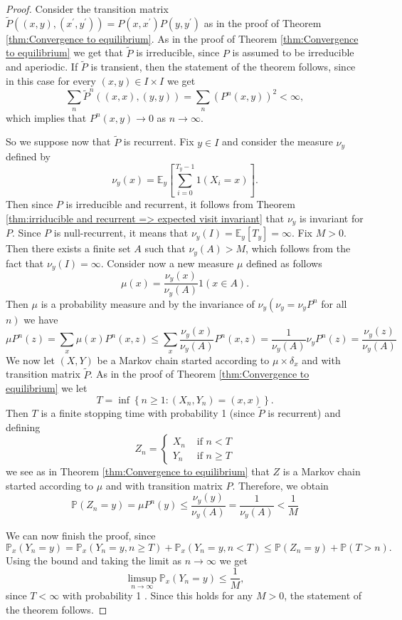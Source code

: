 \documentclass[a4paper]{article}
\begin{document}
\begin{proof}
    Consider the transition matrix $\widetilde{P}\left((x, y),\left(x^{\prime}, y^{\prime}\right)\right)=P\left(x, x^{\prime}\right) P\left(y, y^{\prime}\right)$ as in the proof of Theorem \ref{thm:Convergence to equilibrium}. As in the proof of Theorem \ref{thm:Convergence to equilibrium} we get that $\widetilde{P}$ is irreducible, since $P$ is assumed to be irreducible and aperiodic. If $\widetilde{P}$ is transient, then the statement of the theorem follows, since in this case for every $(x, y) \in I \times I$ we get
    \[
    \sum_n \widetilde{P}^n((x, x),(y, y))=\sum_n\left(P^n(x, y)\right)^2<\infty,
    \]
    which implies that $P^n(x, y) \rightarrow 0$ as $n \rightarrow \infty$.

    So we suppose now that $\widetilde{P}$ is recurrent. Fix $y \in I$ and consider the measure $\nu_y$ defined by
    \[
    \nu_y(x)=\mathbb{E}_y\left[\sum_{i=0}^{T_y-1} 1\left(X_i=x\right)\right] .
    \]
    Then since $P$ is irreducible and recurrent, it follows from Theorem \ref{thm:irriducible and recurrent => expected visit invariant} that $\nu_y$ is invariant for $P$. Since $P$ is null-recurrent, it means that $\nu_y(I)=\mathbb{E}_y\left[T_y\right]=\infty$. Fix $M>0$. Then there exists a finite set $A$ such that $\nu_y(A)>M$, which follows from the fact that $\nu_y(I)=\infty$. Consider now a new measure $\mu$ defined as follows
    \[
    \mu(x)=\frac{\nu_y(x)}{\nu_y(A)} 1(x \in A) .
    \]
    Then $\mu$ is a probability measure and by the invariance of $\nu_y\left(\nu_y=\nu_y P^n\right.$ for all $\left.n\right)$ we have
    \[
    \mu P^n(z)=\sum_x \mu(x) P^n(x, z) \leq \sum_x \frac{\nu_y(x)}{\nu_y(A)} P^n(x, z)=\frac{1}{\nu_y(A)} \nu_y P^n(z)=\frac{\nu_y(z)}{\nu_y(A)}
    \]
    We now let $(X, Y)$ be a Markov chain started according to $\mu \times \delta_x$ and with transition matrix $\widetilde{P}$. As in the proof of Theorem \ref{thm:Convergence to equilibrium} we let
    \[
    T=\inf \left\{n \geq 1:\left(X_n, Y_n\right)=(x, x)\right\} .
    \]
    Then $T$ is a finite stopping time with probability 1 (since $\widetilde{P}$ is recurrent) and defining
    \[
    Z_n=\begin{cases}
        X_n & \text { if } n<T \\
        Y_n & \text { if } n \geq T
    \end{cases} 
    \]
    we see as in Theorem \ref{thm:Convergence to equilibrium} that $Z$ is a Markov chain started according to $\mu$ and with transition matrix $P$. Therefore, we obtain
    \[
    \mathbb{P}\left(Z_n=y\right)=\mu P^n(y) \leq \frac{\nu_y(y)}{\nu_y(A)}=\frac{1}{\nu_y(A)}<\frac{1}{M}
    \]

    We can now finish the proof, since
    \[
    \mathbb{P}_x\left(Y_n=y\right)=\mathbb{P}_x\left(Y_n=y, n \geq T\right)+\mathbb{P}_x\left(Y_n=y, n<T\right) \leq \mathbb{P}\left(Z_n=y\right)+\mathbb{P}(T>n) .
    \]
    Using the bound and taking the limit as $n \rightarrow \infty$ we get
    \[
    \limsup _{n \rightarrow \infty} \mathbb{P}_x\left(Y_n=y\right) \leq \frac{1}{M},
    \]
    since $T<\infty$ with probability 1 . Since this holds for any $M>0$, the statement of the theorem follows.
\end{proof}
\end{document}
